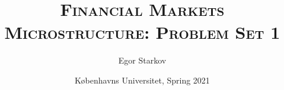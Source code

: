 \documentclass[11pt
, answers
]{exam}
\begin{document}
\title{\textsc{Financial Markets Microstructure: Problem Set 1}}
\date{K{\o}benhavns Universitet, Spring 2021}
\author{Egor Starkov}


\maketitle





%
%
%
\end{document}

